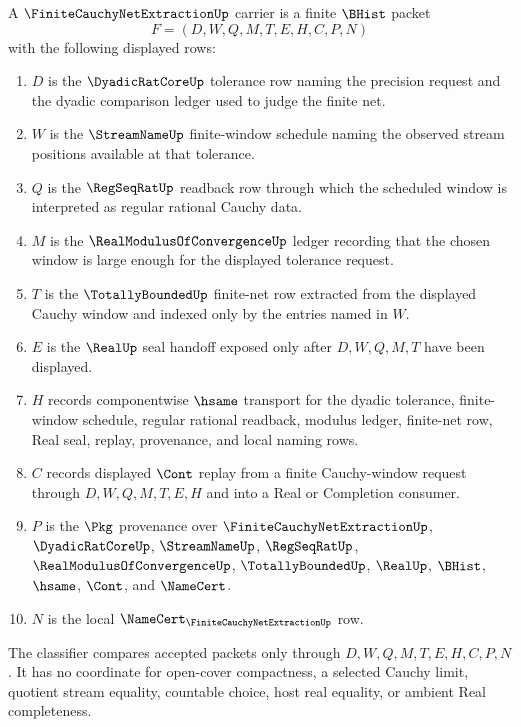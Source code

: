 \begin{definition}\label{def:finite-cauchy-net-extraction-carrier}
A $\FiniteCauchyNetExtractionUp$ carrier is a finite $\BHist$ packet
$$
F=(D,W,Q,M,T,E,H,C,P,N)
$$
with the following displayed rows:
\begin{enumerate}
\item $D$ is the $\DyadicRatCoreUp$ tolerance row naming the precision request and the dyadic comparison ledger used to judge the finite net.
\item $W$ is the $\StreamNameUp$ finite-window schedule naming the observed stream positions available at that tolerance.
\item $Q$ is the $\RegSeqRatUp$ readback row through which the scheduled window is interpreted as regular rational Cauchy data.
\item $M$ is the $\RealModulusOfConvergenceUp$ ledger recording that the chosen window is large enough for the displayed tolerance request.
\item $T$ is the $\TotallyBoundedUp$ finite-net row extracted from the displayed Cauchy window and indexed only by the entries named in $W$.
\item $E$ is the $\RealUp$ seal handoff exposed only after $D,W,Q,M,T$ have been displayed.
\item $H$ records componentwise $\hsame$ transport for the dyadic tolerance, finite-window schedule, regular rational readback, modulus ledger, finite-net row, Real seal, replay, provenance, and local naming rows.
\item $C$ records displayed $\Cont$ replay from a finite Cauchy-window request through $D,W,Q,M,T,E,H$ and into a Real or Completion consumer.
\item $P$ is the $\Pkg$ provenance over $\FiniteCauchyNetExtractionUp$, $\DyadicRatCoreUp$, $\StreamNameUp$, $\RegSeqRatUp$, $\RealModulusOfConvergenceUp$, $\TotallyBoundedUp$, $\RealUp$, $\BHist$, $\hsame$, $\Cont$, and $\NameCert$.
\item $N$ is the local $\NameCert_{\FiniteCauchyNetExtractionUp}$ row.
\end{enumerate}
The classifier compares accepted packets only through $D,W,Q,M,T,E,H,C,P,N$. It has no coordinate for open-cover compactness, a selected Cauchy limit, quotient stream equality, countable choice, host real equality, or ambient Real completeness.
\end{definition}

